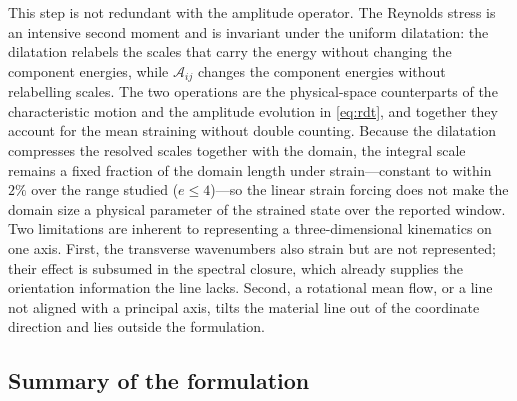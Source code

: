 \documentclass[lineno]{JFM-FLM_Au}
\begin{document}
This step is not redundant with the amplitude operator. The Reynolds
stress is an intensive second moment and is invariant under the uniform
dilatation: the dilatation relabels the scales that carry the energy
without changing the component energies, while $\mathcal{A}_{ij}$ changes
the component energies without relabelling scales. The two operations are
the physical-space counterparts of the characteristic motion and the
amplitude evolution in \eqref{eq:rdt}, and together they account for the
mean straining without double counting. Because the dilatation compresses
the resolved scales together with the domain, the integral scale remains a
fixed fraction of the domain length under strain---constant to within
$2\%$ over the range studied ($e\le4$)---so the linear strain forcing does
not make the domain size a physical parameter of the strained state over
the reported window. Two limitations are inherent to
representing a three-dimensional kinematics on one axis. First, the
transverse wavenumbers also strain but are not represented; their
effect is subsumed in the spectral closure, which already supplies the
orientation information the line lacks. Second, a rotational mean flow,
or a line not aligned with a principal axis, tilts the material line
out of the coordinate direction and lies outside the formulation.

\subsection{Summary of the formulation}\label{sec:summary}
\end{document}
